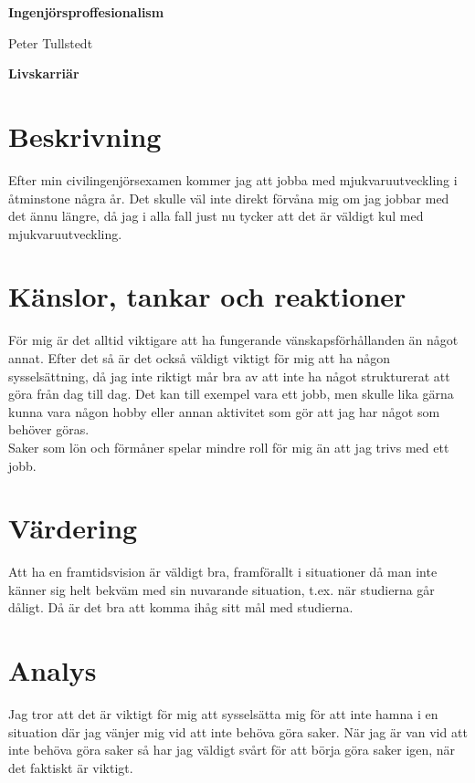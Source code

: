 \documentclass[12pt,a4paper]{article}
\begin{document}
\begin{center}
    \Huge
    \textbf{Ingenjörsproffesionalism}

    \vspace{0.3cm}
    \Large
    Peter Tullstedt
    
    \vspace{0.7cm}
    \textbf{Livskarriär}
\end{center}


\section{Beskrivning}

Efter min civilingenjörsexamen kommer jag att jobba med mjukvaruutveckling i åtminstone några år. Det skulle väl inte direkt förvåna mig om jag jobbar med det ännu längre, då jag i alla fall just nu tycker att det är väldigt kul med mjukvaruutveckling.

\section{Känslor, tankar och reaktioner}

För mig är det alltid viktigare att ha fungerande vänskapsförhållanden än något annat. Efter det så är det också väldigt viktigt för mig att ha någon sysselsättning, då jag inte riktigt mår bra av att inte ha något strukturerat att göra från dag till dag. Det kan till exempel vara ett jobb, men skulle lika gärna kunna vara någon hobby eller annan aktivitet som gör att jag har något som behöver göras.\\

Saker som lön och förmåner spelar mindre roll för mig än att jag trivs med ett jobb.

\section{Värdering}

Att ha en framtidsvision är väldigt bra, framförallt i situationer då man inte känner sig helt bekväm med sin nuvarande situation, t.ex. när studierna går dåligt. Då är det bra att komma ihåg sitt mål med studierna.

\section{Analys}

Jag tror att det är viktigt för mig att sysselsätta mig för att inte hamna i en situation där jag vänjer mig vid att inte behöva göra saker. När jag är van vid att inte behöva göra saker så har jag väldigt svårt för att börja göra saker igen, när det faktiskt är viktigt.\\
\end{document}
